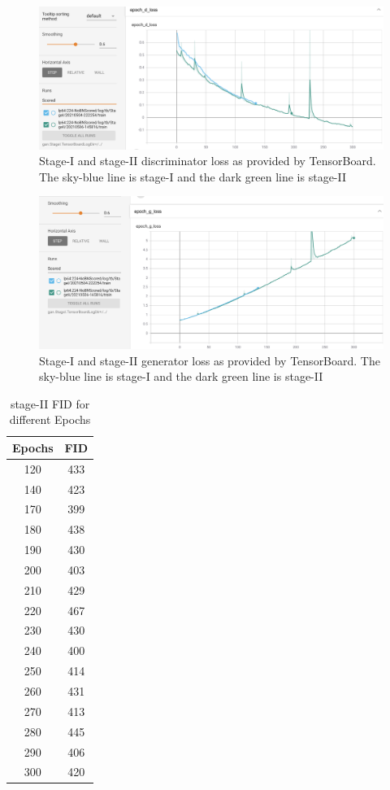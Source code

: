 \documentclass{article}
\begin{document}
	\begin{figure}[h]
	\centering
	\includegraphics[scale=0.3]{images/discriminator_tensorboard.png}
	\caption{Stage-I and stage-II discriminator loss as provided by TensorBoard. The sky-blue line is stage-I and the dark green line is stage-II}
	\label{fig:discrLoss}
	\end{figure}

	\begin{figure}[h]
	\centering
	\includegraphics[scale=0.3]{images/generator_tensorboard.png}
	\caption{Stage-I and stage-II generator loss as provided by TensorBoard. The sky-blue line is stage-I and the dark green line is stage-II}
	\label{fig:genLoss}
	\end{figure}


	\begin{table}
		\caption{stage-II FID for different Epochs}
		\centering
		\begin{tabular}{|c|c|}
			\hline
			Epochs     & FID \\
			\hline
			120	& 433 \\
			140	& 423 \\
			170	& 399 \\
			180	& 438 \\
			190	& 430 \\
			200	& 403 \\
			210	& 429 \\
			220	& 467 \\
			230	& 430 \\
			240	& 400 \\
			250	& 414 \\
			260	& 431 \\
			270	& 413 \\
			280	& 445 \\
			290	& 406 \\
			300	& 420	\\
			\hline
		\end{tabular}
		\label{tab:fid}
	\end{table}
\end{document}

